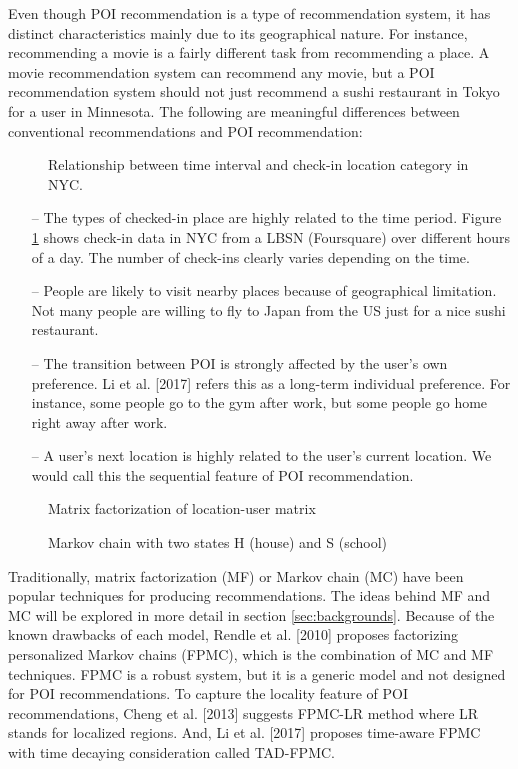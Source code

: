 \documentclass{sig-alternate}
\begin{document}
Even though POI recommendation is a type of recommendation system, it has distinct characteristics 
mainly due to its geographical nature. For instance, recommending a movie is a fairly different task from 
recommending a place. A movie recommendation system can recommend any movie, but a POI recommendation 
system should not just recommend a sushi restaurant in Tokyo for a user in Minnesota. The following are 
meaningful differences between conventional recommendations and POI recommendation:

\begin{figure}
\centering
{}
\caption{Relationship between time interval and check-in location category in NYC.}
\label{fig:NYC_checkIn}
\end{figure}

\begin{itemize}
\item[--] The types of checked-in place are highly related to the time period. Figure \ref{fig:NYC_checkIn} shows check-in data in 
NYC from a LBSN (Foursquare) over different hours of a day. The number of check-ins clearly varies depending 
on the time.
\item[--] People are likely to visit nearby places because of geographical limitation. Not many people are willing 
to fly to Japan from the US just for a nice sushi restaurant.
\item[--] The transition between POI is strongly affected by the user's own preference. Li et al. [2017] refers this as a long-term individual preference. For instance, some people go to the gym after work, but some people go home right away after work. 
\item[--] A user's next location is highly related to the user's current location. We would call this the sequential feature of POI recommendation. 
\end{itemize}

\begin{figure*}
\centering
{}
\caption{Matrix factorization of location-user matrix}
\label{fig:MF}
\end{figure*}

\begin{figure}
\centering
{}
\caption{Markov chain with two states H (house) and S (school)}
\label{fig:MarkovChain}
\end{figure}

Traditionally, matrix factorization (MF) or Markov chain (MC) have been popular techniques for producing recommendations.
The ideas behind MF and MC will be explored in more detail in section \ref{sec:backgrounds}. 
Because of the known drawbacks of each model, Rendle et al. [2010] proposes factorizing personalized 
Markov chains (FPMC), which is the combination of MC and MF techniques. FPMC is a robust system, 
but it is a generic model and not designed for POI recommendations. To capture the locality feature of 
POI recommendations, Cheng et al. [2013] suggests FPMC-LR method where LR stands for localized regions. 
And, Li et al. [2017] proposes time-aware FPMC with time decaying consideration called TAD-FPMC.
\end{document}
